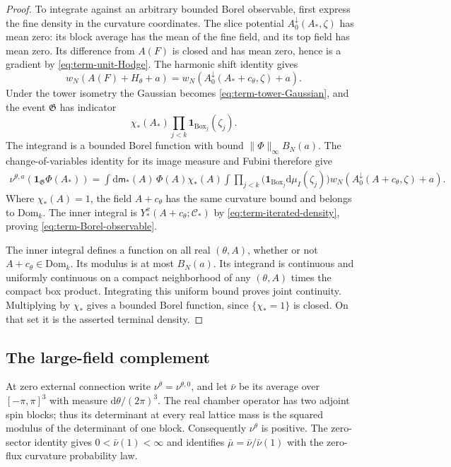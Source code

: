 \documentclass[11pt,letterpaper,reqno]{amsart}
\newcommand{\dd}{\mathrm d}
\begin{document}
\begin{proof}
To integrate against an arbitrary bounded Borel
observable, first express the fine density in the
curvature coordinates.
The slice potential $A_0^\downarrow(A_*,\zeta)$
has mean zero: its block average has the mean of
the fine field, and its top field has mean zero.
Its difference from $A(F)$ is closed and has mean
zero, hence is a gradient by
\eqref{eq:term-unit-Hodge}.
The harmonic shift identity gives
\[
 w_N(A(F)+H_\theta+a)
             =w_N(A_0^\downarrow(A_*+c_\theta,\zeta)+a).
\]
Under the tower isometry the Gaussian becomes
\eqref{eq:term-tower-Gaussian}, and the event
$\mathfrak G$ has indicator
\[
              \chi_*(A_*)\prod_{j<k}\mathbf1_{\mathrm{Box}_j}(\zeta_j).
\]
The integrand is a bounded Borel function with bound
$\|\Phi\|_\infty B_N(a)$.
The change-of-variables identity for its image
measure and Fubini therefore give
\begin{align*}
 \nu^{\theta,a}(\mathbf1_{\mathfrak G}\Phi(A_*))
   =\int\dd\mathsf m_*(A)\,\Phi(A)\chi_*(A)
      \int\prod_{j<k}
                      \big(\mathbf1_{\mathrm{Box}_j}\dd\mu_I(\zeta_j)\big)
                         w_N(A_0^\downarrow(A+c_\theta,\zeta)+a).
\end{align*}
Where $\chi_*(A)=1$, the field $A+c_\theta$ has
the same curvature bound and belongs to
$\mathrm{Dom}_k$. The inner integral is
$Y_*^x(A+c_\theta;\mathscr C_*)$ by
\eqref{eq:term-iterated-density}, proving
\eqref{eq:term-Borel-observable}.

The inner integral defines a function on all real
$(\theta,A)$, whether or not $A+c_\theta\in\mathrm{Dom}_k$.
Its modulus is at most $B_N(a)$.
Its integrand is continuous and uniformly continuous
on a compact neighborhood of any $(\theta,A)$
times the compact box product. Integrating this
uniform bound proves joint continuity.
Multiplying by $\chi_*$ gives a bounded Borel
function, since $\{\chi_*=1\}$ is closed.
On that set it is the asserted terminal density.
\end{proof}

\subsection{The large-field complement}
\label{subsec:term-complement}

At zero external connection write $\nu^\theta=\nu^{\theta,0}$,
and let $\bar\nu$ be its average over $[-\pi,\pi]^3$
with measure $\dd\theta/(2\pi)^3$.
The real chamber operator has two adjoint spin blocks;
thus its determinant at every real lattice mass is
the squared modulus of the determinant of one block.
Consequently $\nu^\theta$ is positive.
The zero-sector identity
\cite[(40)]{ReferenceResponse} gives
$0<\bar\nu(1)<\infty$ and identifies
$\bar\mu=\bar\nu/\bar\nu(1)$ with the zero-flux
curvature probability law.
\end{document}

